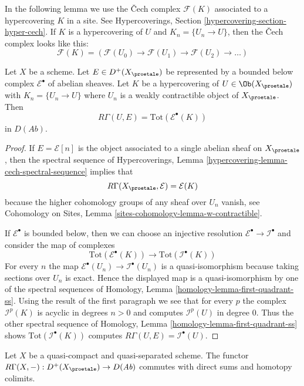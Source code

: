 \noindent
In the following lemma we use the {\v C}ech complex $\mathcal{F}(K)$
associated to a hypercovering $K$ in a site. See
Hypercoverings, Section \ref{hypercovering-section-hyper-cech}.
If $K$ is a hypercovering of $U$ and $K_n = \{U_n \to U\}$, then
the {\v C}ech complex looks like this:
$$
\mathcal{F}(K) = (\mathcal{F}(U_0) \to \mathcal{F}(U_1) \to
\mathcal{F}(U_2) \to\ldots )
$$

\begin{lemma}
\label{lemma-compute-cohomology}
Let $X$ be a scheme. Let $E \in D^+(X_\proetale)$ be represented by
a bounded below complex $\mathcal{E}^\bullet$ of abelian sheaves.
Let $K$ be a hypercovering of $U \in \Ob(X_\proetale)$ with
$K_n = \{U_n \to U\}$ where $U_n$ is a weakly contractible object of
$X_\proetale$. Then
$$
R\Gamma(U, E) = \text{Tot}(\mathcal{E}^\bullet(K))
$$
in $D(\textit{Ab})$.
\end{lemma}

\begin{proof}
If $E = \mathcal{E}[n]$ is the object associated to a single abelian
sheaf on $X_\proetale$, then the spectral sequence of
Hypercoverings, Lemma \ref{hypercovering-lemma-cech-spectral-sequence}
implies that
$$
R\Gamma(X_\proetale, \mathcal{E}) = \mathcal{E}(K)
$$
because the higher cohomology groups of any sheaf over $U_n$ vanish, see
Cohomology on Sites, Lemma \ref{sites-cohomology-lemma-w-contractible}.

\medskip\noindent
If $\mathcal{E}^\bullet$ is bounded below, then we can choose an injective
resolution $\mathcal{E}^\bullet \to \mathcal{I}^\bullet$ and consider
the map of complexes
$$
\text{Tot}(\mathcal{E}^\bullet(K)) \longrightarrow
\text{Tot}(\mathcal{I}^\bullet(K))
$$
For every $n$ the map $\mathcal{E}^\bullet(U_n) \to \mathcal{I}^\bullet(U_n)$
is a quasi-isomorphism because taking sections over $U_n$ is exact.
Hence the displayed map is a quasi-isomorphism by one of the spectral
sequences of
Homology, Lemma \ref{homology-lemma-first-quadrant-ss}.
Using the result of the first paragraph we see that for every $p$
the complex $\mathcal{I}^p(K)$ is acyclic in degrees $n > 0$ and
computes $\mathcal{I}^p(U)$ in degree $0$. Thus the other spectral
sequence of
Homology, Lemma \ref{homology-lemma-first-quadrant-ss}
shows $\text{Tot}(\mathcal{I}^\bullet(K))$ computes
$R\Gamma(U, E) = \mathcal{I}^\bullet(U)$.
\end{proof}

\begin{lemma}
\label{lemma-quasi-compact-quasi-separated-commutes-direct-sums}
Let $X$ be a quasi-compact and quasi-separated scheme.
The functor $R\Gamma(X, -) : D^+(X_\proetale) \to D(\textit{Ab})$
commutes with direct sums and homotopy colimits.
\end{lemma}

